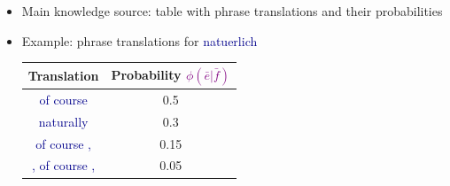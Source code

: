 \documentclass[landscape]{slides}
\newcommand{\example}[1]{\textcolor{darkblue}{\rm #1}}
\newcommand{\maths}[1]{\textcolor{purple}{#1}}
\begin{document}

\begin{itemize} \vspace{10mm}
\item Main knowledge source: table with phrase translations and their probabilities
\item Example: phrase translations for \example{natuerlich}
\begin{center}
\begin{tabular}{|c|c|} \hline
{\bf Translation} & {\bf Probability \maths{$\phi(\bar{e}|\bar{f})$}} \\ \hline
\example{of course} & 0.5 \\ \hline
\example{naturally} & 0.3 \\ \hline
\example{of course ,} & 0.15 \\ \hline
\example{, of course ,} & 0.05 \\ \hline
\end{tabular}
\end{center}
\end{itemize}

\end{document}
